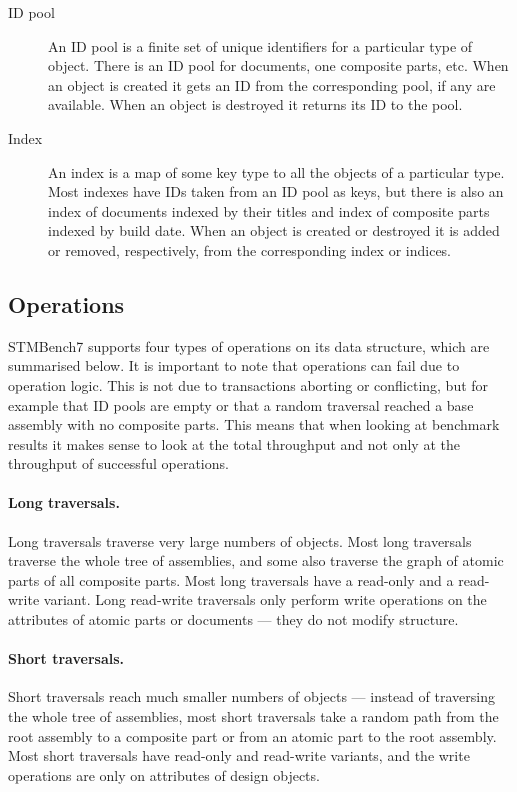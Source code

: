 \documentclass[12pt,a4paper,oneside,openright]{report}
\begin{document}
\begin{description}
\item[ID pool] An ID pool is a finite set of unique identifiers for a
  particular type of object. There is an ID pool for documents, one
  composite parts, etc. When an object is created it gets an ID from
  the corresponding pool, if any are available. When an object is
  destroyed it returns its ID to the pool.
\item[Index] An index is a map of some key type to all the objects of
  a particular type. Most indexes have IDs taken from an ID pool as
  keys, but there is also an index of documents indexed by their
  titles and index of composite parts indexed by build date. When an
  object is created or destroyed it is added or removed, respectively,
  from the corresponding index or indices.
\end{description}

\subsection{Operations}
\label{sec:impl:operations}

STMBench7 supports four types of operations on its data structure,
which are summarised below. It is important to note that operations
can fail due to operation logic. This is not due to transactions
aborting or conflicting, but for example that ID pools are empty or
that a random traversal reached a base assembly with no composite
parts. This means that when looking at benchmark results it makes
sense to look at the total throughput and not only at the throughput
of successful operations.

\paragraph{Long traversals.} Long traversals traverse very large
numbers of objects. Most long traversals traverse the whole tree of
assemblies, and some also traverse the graph of atomic parts of all
composite parts. Most long traversals have a read-only and a
read-write variant. Long read-write traversals only perform write
operations on the attributes of atomic parts or documents --- they do
not modify structure.

\paragraph{Short traversals.} Short traversals reach much smaller
numbers of objects --- instead of traversing the whole tree of
assemblies, most short traversals take a random path from the root
assembly to a composite part or from an atomic part to the root
assembly. Most short traversals have read-only and read-write
variants, and the write operations are only on attributes of design
objects.
\end{document}
